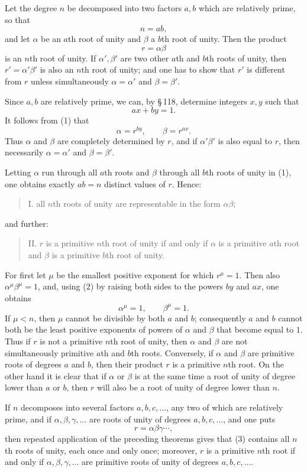 \documentclass[11pt]{article}
\begin{document}
Let the degree $n$ be decomposed into two factors $a,b$ which are relatively prime, so that
\[
        n=ab,
\]
and let $\alpha$ be an $a$th root of unity and $\beta$ a $b$th root of unity. Then the product
\[
\tag{1}        r=\alpha\beta
\]
is an $n$th root of unity. If $\alpha',\beta'$ are two other $a$th and $b$th roots of unity, then $r'=\alpha'\beta'$ is also an $n$th root of unity; and one has to show that $r'$ is different from $r$ unless simultaneously $\alpha=\alpha'$ and $\beta=\beta'$.

Since $a,b$ are relatively prime, we can, by \S\,118, determine integers $x,y$ such that
\[
\tag{2}        ax+by=1.
\]
It follows from (1) that
\[
        \alpha=r^{by},\qquad \beta=r^{ax}.
\]
Thus $\alpha$ and $\beta$ are completely determined by $r$, and if $\alpha'\beta'$ is also equal to $r$, then necessarily $\alpha=\alpha'$ and $\beta=\beta'$.

Letting $\alpha$ run through all $a$th roots and $\beta$ through all $b$th roots of unity in (1), one obtains exactly $ab=n$ distinct values of $r$. Hence:
\begin{quote}
I. all $n$th roots of unity are representable in the form $\alpha\beta$;
\end{quote}
and further:
\begin{quote}
II. $r$ is a primitive $n$th root of unity if and only if $\alpha$ is a primitive $a$th root and $\beta$ is a primitive $b$th root of unity.
\end{quote}
For first let $\mu$ be the smallest positive exponent for which $r^\mu=1$. Then also $\alpha^\mu\beta^\mu=1$, and, using (2) by raising both sides to the powers $by$ and $ax$, one obtains
\[
        \alpha^\mu=1,
        \qquad
        \beta^\mu=1.
\]
If $\mu<n$, then $\mu$ cannot be divisible by both $a$ and $b$; consequently $a$ and $b$ cannot both be the least positive exponents of powers of $\alpha$ and $\beta$ that become equal to $1$. Thus if $r$ is not a primitive $n$th root of unity, then $\alpha$ and $\beta$ are not simultaneously primitive $a$th and $b$th roots. Conversely, if $\alpha$ and $\beta$ are primitive roots of degrees $a$ and $b$, then their product $r$ is a primitive $n$th root. On the other hand it is clear that if $\alpha$ or $\beta$ is at the same time a root of unity of degree lower than $a$ or $b$, then $r$ will also be a root of unity of degree lower than $n$.

If $n$ decomposes into several factors $a,b,c,\ldots$, any two of which are relatively prime, and if $\alpha,\beta,\gamma,\ldots$ are roots of unity of degrees $a,b,c,\ldots$, and one puts
\[
\tag{3}        r=\alpha\beta\gamma\cdots,
\]
then repeated application of the preceding theorems gives that (3) contains all $n$th roots of unity, each once and only once; moreover, $r$ is a primitive $n$th root if and only if $\alpha,\beta,\gamma,\ldots$ are primitive roots of unity of degrees $a,b,c,\ldots$.
\end{document}
